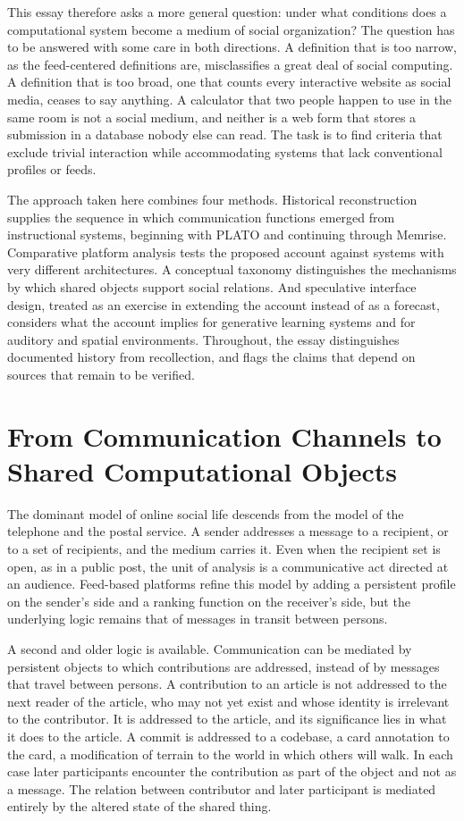 \documentclass[11pt]{article}
\theoremstyle{remark}
\begin{document}
This essay therefore asks a more general question: under what conditions does a computational system become a medium of social organization? The question has to be answered with some care in both directions. A definition that is too narrow, as the feed-centered definitions are, misclassifies a great deal of social computing. A definition that is too broad, one that counts every interactive website as social media, ceases to say anything. A calculator that two people happen to use in the same room is not a social medium, and neither is a web form that stores a submission in a database nobody else can read. The task is to find criteria that exclude trivial interaction while accommodating systems that lack conventional profiles or feeds.

The approach taken here combines four methods. Historical reconstruction supplies the sequence in which communication functions emerged from instructional systems, beginning with PLATO and continuing through Memrise. Comparative platform analysis tests the proposed account against systems with very different architectures. A conceptual taxonomy distinguishes the mechanisms by which shared objects support social relations. And speculative interface design, treated as an exercise in extending the account instead of as a forecast, considers what the account implies for generative learning systems and for auditory and spatial environments. Throughout, the essay distinguishes documented history from recollection, and flags the claims that depend on sources that remain to be verified.

\section{From Communication Channels to Shared Computational Objects}
\label{sec:objects}

The dominant model of online social life descends from the model of the telephone and the postal service. A sender addresses a message to a recipient, or to a set of recipients, and the medium carries it. Even when the recipient set is open, as in a public post, the unit of analysis is a communicative act directed at an audience. Feed-based platforms refine this model by adding a persistent profile on the sender's side and a ranking function on the receiver's side, but the underlying logic remains that of messages in transit between persons.

A second and older logic is available. Communication can be mediated by persistent objects to which contributions are addressed, instead of by messages that travel between persons. A contribution to an article is not addressed to the next reader of the article, who may not yet exist and whose identity is irrelevant to the contributor. It is addressed to the article, and its significance lies in what it does to the article. A commit is addressed to a codebase, a card annotation to the card, a modification of terrain to the world in which others will walk. In each case later participants encounter the contribution as part of the object and not as a message. The relation between contributor and later participant is mediated entirely by the altered state of the shared thing.
\end{document}
